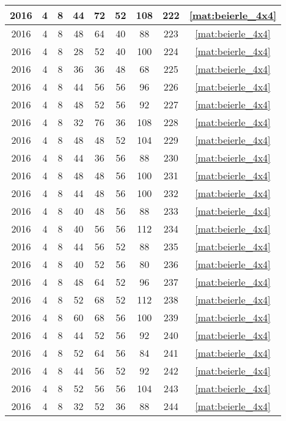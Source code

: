 \begin{longtable}{|c|c|c|c|c|c|c|c|c|}
2016 & 4 & 8 & 44 & 72 & 52 & 108 & 222 & \eqref{mat:beierle_4x4} \\ \hline 
2016 & 4 & 8 & 48 & 64 & 40 & 88 & 223 & \eqref{mat:beierle_4x4} \\ \hline 
2016 & 4 & 8 & 28 & 52 & 40 & 100 & 224 & \eqref{mat:beierle_4x4} \\ \hline 
2016 & 4 & 8 & 36 & 36 & 48 & 68 & 225 & \eqref{mat:beierle_4x4} \\ \hline 
2016 & 4 & 8 & 44 & 56 & 56 & 96 & 226 & \eqref{mat:beierle_4x4} \\ \hline 
2016 & 4 & 8 & 48 & 52 & 56 & 92 & 227 & \eqref{mat:beierle_4x4} \\ \hline 
2016 & 4 & 8 & 32 & 76 & 36 & 108 & 228 & \eqref{mat:beierle_4x4} \\ \hline 
2016 & 4 & 8 & 48 & 48 & 52 & 104 & 229 & \eqref{mat:beierle_4x4} \\ \hline 
2016 & 4 & 8 & 44 & 36 & 56 & 88 & 230 & \eqref{mat:beierle_4x4} \\ \hline 
2016 & 4 & 8 & 48 & 48 & 56 & 100 & 231 & \eqref{mat:beierle_4x4} \\ \hline 
2016 & 4 & 8 & 44 & 48 & 56 & 100 & 232 & \eqref{mat:beierle_4x4} \\ \hline 
2016 & 4 & 8 & 40 & 48 & 56 & 88 & 233 & \eqref{mat:beierle_4x4} \\ \hline 
2016 & 4 & 8 & 40 & 56 & 56 & 112 & 234 & \eqref{mat:beierle_4x4} \\ \hline 
2016 & 4 & 8 & 44 & 56 & 52 & 88 & 235 & \eqref{mat:beierle_4x4} \\ \hline 
2016 & 4 & 8 & 40 & 52 & 56 & 80 & 236 & \eqref{mat:beierle_4x4} \\ \hline 
2016 & 4 & 8 & 48 & 64 & 52 & 96 & 237 & \eqref{mat:beierle_4x4} \\ \hline 
2016 & 4 & 8 & 52 & 68 & 52 & 112 & 238 & \eqref{mat:beierle_4x4} \\ \hline 
2016 & 4 & 8 & 60 & 68 & 56 & 100 & 239 & \eqref{mat:beierle_4x4} \\ \hline 
2016 & 4 & 8 & 44 & 52 & 56 & 92 & 240 & \eqref{mat:beierle_4x4} \\ \hline 
2016 & 4 & 8 & 52 & 64 & 56 & 84 & 241 & \eqref{mat:beierle_4x4} \\ \hline 
2016 & 4 & 8 & 44 & 56 & 52 & 92 & 242 & \eqref{mat:beierle_4x4} \\ \hline 
2016 & 4 & 8 & 52 & 56 & 56 & 104 & 243 & \eqref{mat:beierle_4x4} \\ \hline 
2016 & 4 & 8 & 32 & 52 & 36 & 88 & 244 & \eqref{mat:beierle_4x4} \\ \hline 

\end{longtable}
